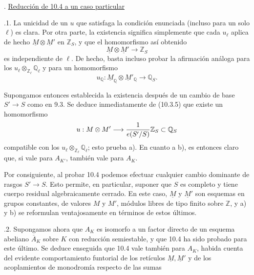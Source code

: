 
\medskip
{}. \underline{Reducción de 10.4 a un caso particular}

\smallskip
{}.1. La unicidad de un $u$ que satisfaga la condición enunciada
(incluso para un solo $\ell$) es clara. Por otra parte, la existencia
significa simplemente que cada $u_\ell$ aplica de hecho
$\underline M\otimes\underline M'$ en $\mathbb Z_S$, y que el
homomorfismo así obtenido
\begin{equation*}
\underline M\otimes\underline M'\longrightarrow\mathbb Z_S
\end{equation*}
es independiente de $\ell$. De hecho, basta incluso probar la
afirmación análoga para los
$u_\ell\otimes_{\mathbb Z_\ell}\mathbb Q_\ell$ y para un
homomorfismo
\begin{equation*}
u_{\mathbb Q}:\underline M_{\mathbb Q}\otimes
 \underline M'_{\mathbb Q}\longrightarrow\mathbb Q_S.
\end{equation*}

Supongamos entonces establecida la existencia después de un cambio de
base $S'\longrightarrow S$ como en 9.3. Se deduce inmediatamente de
(10.3.5) que existe un homomorfismo
\begin{equation*}
u:\underline M\otimes\underline M'
 \longrightarrow\frac{1}{e(S'/S)}\mathbb Z_S\subset\sisi{Q_S}{\mathbb Q_S}
\end{equation*}
compatible con los
$u_\ell\otimes_{\mathbb Z_\ell}\mathbb Q_\ell$; esto prueba a). En
cuanto a b), es entonces claro que, si vale para $A_{K'}$, también vale
para $A_K$.

Por consiguiente, al probar 10.4 podemos efectuar cualquier cambio
dominante de rasgos $S'\longrightarrow S$. Esto permite, en particular,
suponer que $S$ es completo y tiene cuerpo residual algebraicamente
cerrado. En este caso, $\underline M$ y $\underline M'$ son esquemas en
grupos constantes, de valores $M$ y $M'$, módulos libres de tipo finito
sobre $\mathbb Z$, y a) y b) se reformulan ventajosamente en términos
de estos últimos.

\smallskip
{}.2. Supongamos ahora que $A_K$ es isomorfo a un factor directo de
un esquema abeliano $\overline A_K$ sobre $K$ con reducción
semiestable, y que 10.4 ha sido probado para este último. Se deduce
enseguida que 10.4 vale también para $A_K$, habida cuenta del evidente
comportamiento funtorial de los retículos $\underline M,\underline M'$
y de los acoplamientos de monodromía respecto de las sumas

